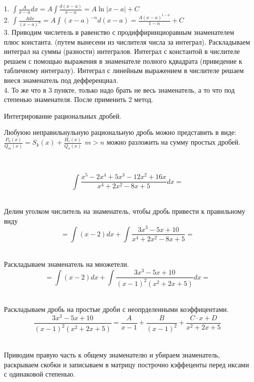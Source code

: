 1. $\int \frac{A}{x-a}dx = A\int \frac{d(x-a)}{x-a} = A\ln|x-a| + C$\\
2. $\int \frac{Adx}{(x-a)^n} = A\int (x-a)^{-n}d(x-a)
  = \frac{A(x-a)^{1-n}}{1-n} + C$\\
3. Приводим числетель в равенство с продиффиринциоравным знаменателем плюс
  константа. (путем вынесени из числителя числа за интеграл).
  Раскладываем интеграл на суммы (разности) интегралов. Интеграл с константой
  в числителе решаем с помощью выражения в знаменателе полного кдвадрата
  (приведение к табличному интегралу). Интеграл с линейным выражением
  в числителе решаем внеся знаменатель под дефференциал.\\
4. То же что в 3 пункте, только надо брать не весь знаменатель, а то что под
  степенью знаменателя. После применить 2 метод.\\

\begin{title}[\Large]
  Интегрирование рациональных дробей.
\end{title}
Любуюю неправильнульную рациональную дробь можно представить в виде:\\
$\frac{P_n(x)}{Q_m(x)} = S_k(x) + \frac{H_c(x)}{Q_n(x)} ~~ m>n$ можно разложить
на сумму простых дробей.\\

\begin{center}
  \\
\end{center}

\[\int \frac{x^5 - 2x^4 + 5x^3 - 12x^2 + 16x}{x^4 + 2x^2 - 8x + 5} dx = \]

\\
Делим уголком числитель на знаменатель, чтобы дробь привести к правильному виду
\[= \int (x - 2)dx + \int \frac{3x^3 - 5x + 10}{x^4 + 2x^2 - 8x + 5} = \]

\\
Раскладываем знаменатель на множетели.
\[= \int (x - 2)dx + \int \frac{3x^3 - 5x + 10}{(x-1)^2 (x^2+2x+5)} dx = \]

\\
Раскладываем дробь на простые дроби с неопрделенными коэффицентами.
\[
  \frac{3x^3 - 5x + 10}{(x-1)^2 (x^2+2x+5)} = \frac{A}{x - 1} +
  \frac{B}{(x - 1)^2} + \frac{C \cdot x + D}{x^2 + 2x + 5}
\]

\\
Приводим правую часть к общему знаменателю и убираем знаменатель, раскрываем
скобки и записываем в матрицу построчно кэффеценты перед иксами с одинаковой
степенью.\\

